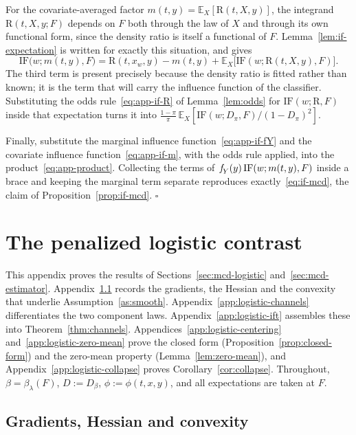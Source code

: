 \documentclass[11pt]{article}
\theoremstyle{plain}
\theoremstyle{definition}
\theoremstyle{remark}
\newcommand{\pE}{\ensuremath{\mathbb{E}}}
\newcommand{\pf}[1]{\ensuremath{\,\mathlarger{\textit{f}}_{#1}}}
\newcommand{\ratio}{\ensuremath{\pi}}
\newcommand{\contrast}{D_{\ratio}}
\newcommand{\DensityRatio}{\text{R}}
\newcommand{\IF}{\mathrm{IF}}
\begin{document}
For the covariate-averaged factor $m(t,y) = \pE_X[\DensityRatio(t,X,y)]$, the integrand
$\DensityRatio(t,X,y;F)$ depends on $F$ both through the law of $X$ and through its own
functional form, since the density ratio is itself a functional of $F$. Lemma~\ref{lem:if-expectation}
is written for exactly this situation, and gives
\begin{equation}
\IF\big(w;m(t,y),F\big)
= \DensityRatio(t,x_w,y) - m(t,y)
+ \pE_X\big[ \IF(w;\DensityRatio(t,X,y),F) \big].
\label{eq:app-if-m}
\end{equation}
The third term is present precisely because the density ratio is fitted rather than known; it
is the term that will carry the influence function of the classifier. Substituting the odds
rule~\eqref{eq:app-if-R} of Lemma~\ref{lem:odds} for $\IF(w;\DensityRatio,F)$ inside that
expectation turns it into
$\frac{1-\ratio}{\ratio}\,\pE_X[\IF(w;\contrast,F)/(1-\contrast)^2]$.

Finally, substitute the marginal influence function~\eqref{eq:app-if-fY} and the covariate
influence function~\eqref{eq:app-if-m}, with the odds rule applied, into the
product~\eqref{eq:app-product}. Collecting the terms of $\pf{Y}(y)\,\IF(w;m(t,y),F)$ inside a
brace and keeping the marginal term separate reproduces exactly~\eqref{eq:if-mcd}, the claim of
Proposition~\ref{prop:if-mcd}. \hfill$\square$

\section{The penalized logistic contrast}
\label{app:logistic}

This appendix proves the results of Sections~\ref{sec:mcd-logistic}
and~\ref{sec:mcd-estimator}. Appendix~\ref{app:logistic-grads} records the gradients, the
Hessian and the convexity that underlie Assumption~\ref{as:smooth}.
Appendix~\ref{app:logistic-channels} differentiates the two component laws.
Appendix~\ref{app:logistic-ift} assembles these into Theorem~\ref{thm:channels}.
Appendices~\ref{app:logistic-centering} and~\ref{app:logistic-zero-mean} prove the closed form
(Proposition~\ref{prop:closed-form}) and the zero-mean property (Lemma~\ref{lem:zero-mean}), and
Appendix~\ref{app:logistic-collapse} proves Corollary~\ref{cor:collapse}. Throughout,
$\beta = \beta_\lambda(F)$, $D := D_\beta$, $\phi := \phi(t,x,y)$, and all expectations are
taken at $F$.

\subsection{Gradients, Hessian and convexity}
\label{app:logistic-grads}
\end{document}
